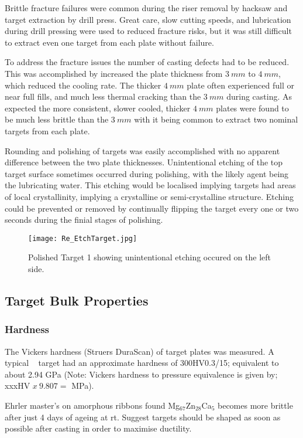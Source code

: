 \documentclass[a4paper,12pt,oneside]{report}%
\begin{document}
Brittle fracture failures were common during the riser removal by hacksaw and target extraction by drill press. Great care, slow cutting speeds, and lubrication during drill pressing were used to reduced fracture risks, but it was still difficult to extract even one target from each plate without failure.

To address the fracture issues the number of casting defects had to be reduced. This was accomplished by increased the plate thickness from $3~ mm$ to $4~ mm$, which reduced the cooling rate. The thicker $4~ mm$ plate often experienced full or near full fills, and much less thermal cracking than the $3~ mm$ during casting. As expected the more consistent, slower cooled, thicker $4~ mm$ plates were found to be much less brittle than the $3~ mm$ with it being common to extract two nominal targets from each plate.

Rounding and polishing of targets was easily accomplished with no apparent difference between the two plate thicknesses. Unintentional etching of the top target surface sometimes occurred during polishing, with the likely agent being the lubricating water. This etching would be localised implying targets had areas of local crystallinity, implying a crystalline or semi-crystalline structure. Etching could be prevented or removed by continually flipping the target every one or two seconds during the finial stages of polishing. 

\begin{figure}[htbp]
	\centering
	\texttt{[image: Re\_EtchTarget.jpg]}
	\caption{Polished Target 1 showing unintentional etching occured on the left side.}
	\label{fig:EtchedTarget}
\end{figure}

\subsection{Target Bulk Properties}
\subsubsection{Hardness}
The Vickers hardness (Struers DuraScan) of target plates was measured. A typical \MgZnCa~ target had an approximate hardness of 300HV0.3/15; equivalent to about 2.94 GPa (Note: Vickers hardness to pressure equivalence is given by; xxxHV $x~ 9.807 =$ MPa).

Ehrler \cite{Ehrler2008} master's on amorphous ribbons found Mg$_{67}$Zn$_{28}$Ca$_{5}$ becomes more brittle after just 4 days of ageing at \gls{rt}. Suggest targets should be shaped as soon as possible after casting in order to maximise ductility. 
\end{document}
